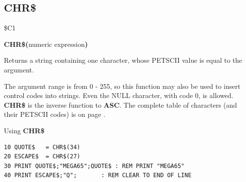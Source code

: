 
\newpage
{}
\subsection{CHR\$}
\label{chrcommand}
\begin{description}[leftmargin=2cm,style=nextline]
\item [Token:] \$C1
\item [Format:] {\bf CHR\$(}numeric expression{\bf)}
\item [Usage:] Returns a string containing one character, whose PETSCII
               value is equal to the argument.

\item [Remarks:] The argument range is from 0 - 255, so this function may
                 also be used to insert control codes into strings.
                 Even the NULL character, with code 0, is allowed. \\
                 {\bf CHR\$} is the inverse function to {\bf ASC}.
                 The complete table of characters (and their PETSCII codes) is
                 on page \pageref{appendix:asciicodes}.
\item [Example:] Using {\bf CHR\$}
\begin{tcolorbox}[colback=black,coltext=white]
\verbatimfont{\codefont}
\begin{verbatim}
10 QUOTE$   = CHR$(34)
20 ESCAPE$  = CHR$(27)
30 PRINT QUOTE$;"MEGA65";QUOTE$ : REM PRINT "MEGA65"
40 PRINT ESCAPE$;"Q";       : REM CLEAR TO END OF LINE
\end{verbatim}
\end{tcolorbox}
\end{description}


\newpage
